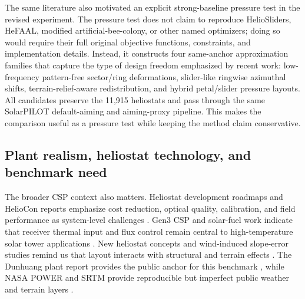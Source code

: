 \documentclass[final,3p,times]{elsarticle}
\begin{document}
The same literature also motivated an explicit strong-baseline pressure test in the revised experiment. The pressure test does not claim to reproduce HelioSliders, HeFAAL, modified artificial-bee-colony, or other named optimizers; doing so would require their full original objective functions, constraints, and implementation details. Instead, it constructs four same-anchor approximation families that capture the type of design freedom emphasized by recent work: low-frequency pattern-free sector/ring deformations, slider-like ringwise azimuthal shifts, terrain-relief-aware redistribution, and hybrid petal/slider pressure layouts. All candidates preserve the 11,915 heliostats and pass through the same SolarPILOT default-aiming and aiming-proxy pipeline. This makes the comparison useful as a pressure test while keeping the method claim conservative.

\subsection{Plant realism, heliostat technology, and benchmark need}
The broader CSP context also matters. Heliostat development roadmaps and HelioCon reports emphasize cost reduction, optical quality, calibration, and field performance as system-level challenges \cite{pfahl2017progress,zhu2022roadmap,zhu2023heliocon,zhu2024helioconannual}. Gen3 CSP and solar-fuel work indicate that receiver thermal input and flux control remain central to high-temperature solar tower applications \cite{turchi2021gen3,zoller2022solarfuels}. New heliostat concepts and wind-induced slope-error studies remind us that layout interacts with structural and terrain effects \cite{freeman2025tiltroll,li2026windslope}. The Dunhuang plant report provides the public anchor for this benchmark \cite{huang2024dunhuang}, while NASA POWER and SRTM provide reproducible but imperfect public weather and terrain layers \cite{nasa2023power,usgs2015srtm}.
\end{document}

